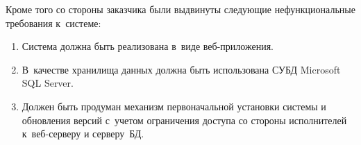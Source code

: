 Кроме того со стороны заказчика были выдвинуты следующие нефункциональные требования к~системе:
\label{part:requirements}
\begin{enumerate}
\item{
  Система должна быть реализована в~виде веб-приложения.
}
\item{
  В~качестве хранилища данных должна быть использована СУБД Microsoft SQL Server.
}
\item{
  Должен быть продуман механизм первоначальной установки системы и обновления версий 
  с~учетом ограничения доступа со стороны исполнителей к~веб-серверу и серверу~БД.
}
\end{enumerate}
